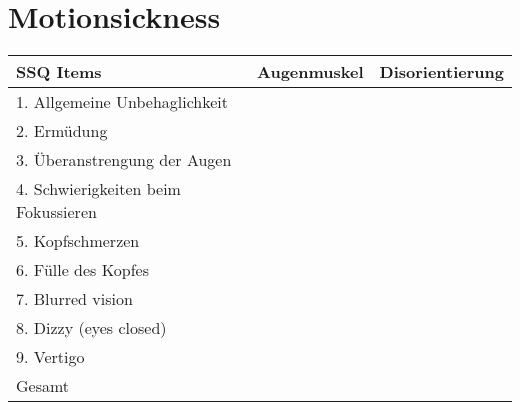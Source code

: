 \documentclass[a4paper,10pt,BCOR10mm,oneside,headsepline]{scrartcl}
\begin{document}
\section{Motionsickness}
		\begin{center}
			\begin{tabular}{| l | c | c |}
				\hline
				SSQ Items & Augenmuskel & Disorientierung\\
				\hline
				1. Allgemeine Unbehaglichkeit & &\\
				\hline
				2. Erm\"udung & & \\
				\hline
				3. \"Uberanstrengung der Augen &  &\\
				\hline
				4. Schwierigkeiten beim Fokussieren & & \\
				\hline
				5. Kopfschmerzen & &  \\
				\hline
				6. F\"ulle des Kopfes & &  \\
				\hline
				7. Blurred vision & &  \\
				\hline
				8. Dizzy (eyes closed) & & \\
				\hline
				9. Vertigo &  &\\
				\hline
				\hline
				Gesamt &  & \\
				\hline
			\end{tabular}
		\end{center}

	 
\end{document}
